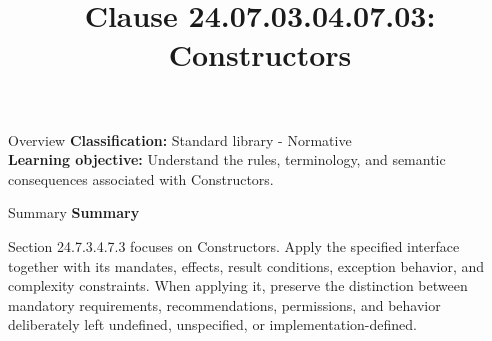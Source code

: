 \documentclass[10pt,letterpaper]{article}
\title{Clause 24.07.03.04.07.03: Constructors}
\author{}
\date{}
\begin{document}
\maketitle
\begin{CornellOverviewBox}{Overview}
\textbf{Classification:} Standard library - Normative\\[2pt]
\textbf{Learning objective:} Understand the rules, terminology, and semantic consequences associated with Constructors.
\end{CornellOverviewBox}\begin{CornellSummaryBox}{Summary}
{\sffamily\bfseries\color{Accent} Summary}\par\vspace{3pt}Section 24.7.3.4.7.3 focuses on Constructors. Apply the specified interface together with its mandates, effects, result conditions, exception behavior, and complexity constraints. When applying it, preserve the distinction between mandatory requirements, recommendations, permissions, and behavior deliberately left undefined, unspecified, or implementation-defined.
\end{CornellSummaryBox}
\end{document}
